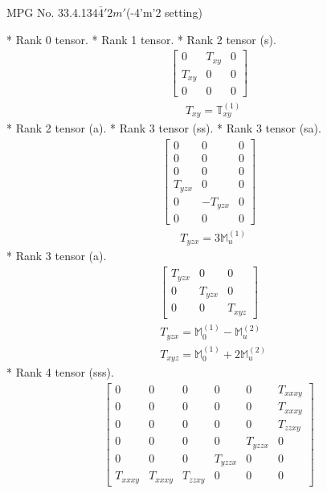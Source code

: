 \documentclass[fleqn,8pt,landscape]{jsarticle}
\begin{document}
\setcounter{MaxMatrixCols}{32}

\renewcommand{\tablename}{Table~}
\renewcommand{\figurename}{Figure~}
\begin{center}
\LARGE
MPG No. 33.4.134\quad$\bar{4}'2m'$\quad(-4'm'2 setting)
\end{center}
* Rank 0 tensor.
* Rank 1 tensor.
* Rank 2 tensor (s).
\begin{align*}
\begin{bmatrix} 0 & T_{xy} & 0 \\ T_{xy} & 0 & 0 \\ 0 & 0 & 0 \end{bmatrix}
\end{align*}
\begin{align*}
& T_{xy} = \mathbb{T}_{xy}^{(1)}
\end{align*}
* Rank 2 tensor (a).
* Rank 3 tensor (ss).
* Rank 3 tensor (sa).
\begin{align*}
\begin{bmatrix} 0 & 0 & 0 \\ 0 & 0 & 0 \\ 0 & 0 & 0 \\ T_{yzx} & 0 & 0 \\ 0 & - T_{yzx} & 0 \\ 0 & 0 & 0 \end{bmatrix}
\end{align*}
\begin{align*}
& T_{yzx} = 3 \mathbb{M}_{u}^{(1)}
\end{align*}
* Rank 3 tensor (a).
\begin{align*}
\begin{bmatrix} T_{yzx} & 0 & 0 \\ 0 & T_{yzx} & 0 \\ 0 & 0 & T_{xyz} \end{bmatrix}
\end{align*}
\begin{align*}
& T_{yzx} = \mathbb{M}_{0}^{(1)} - \mathbb{M}_{u}^{(2)} \\
& T_{xyz} = \mathbb{M}_{0}^{(1)} + 2 \mathbb{M}_{u}^{(2)}
\end{align*}
* Rank 4 tensor (sss).
\begin{align*}
\begin{bmatrix} 0 & 0 & 0 & 0 & 0 & T_{xxxy} \\ 0 & 0 & 0 & 0 & 0 & T_{xxxy} \\ 0 & 0 & 0 & 0 & 0 & T_{zzxy} \\ 0 & 0 & 0 & 0 & T_{yzzx} & 0 \\ 0 & 0 & 0 & T_{yzzx} & 0 & 0 \\ T_{xxxy} & T_{xxxy} & T_{zzxy} & 0 & 0 & 0 \end{bmatrix}
\end{align*}
\end{document}
